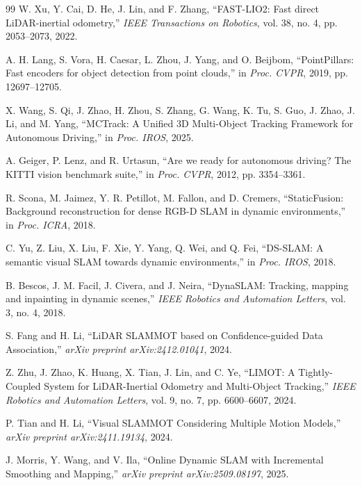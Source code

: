 \documentclass[a4paper,12pt]{article}
\begin{document}
\clearpage
{}
\begin{thebibliography}{99}
W. Xu, Y. Cai, D. He, J. Lin, and F. Zhang, ``FAST-LIO2: Fast direct LiDAR-inertial odometry,'' \emph{IEEE Transactions on Robotics}, vol. 38, no. 4, pp. 2053--2073, 2022.

A. H. Lang, S. Vora, H. Caesar, L. Zhou, J. Yang, and O. Beijbom, ``PointPillars: Fast encoders for object detection from point clouds,'' in \emph{Proc. CVPR}, 2019, pp. 12697--12705.

X. Wang, S. Qi, J. Zhao, H. Zhou, S. Zhang, G. Wang, K. Tu, S. Guo, J. Zhao, J. Li, and M. Yang, ``MCTrack: A Unified 3D Multi-Object Tracking Framework for Autonomous Driving,'' in \emph{Proc. IROS}, 2025.

A. Geiger, P. Lenz, and R. Urtasun, ``Are we ready for autonomous driving? The KITTI vision benchmark suite,'' in \emph{Proc. CVPR}, 2012, pp. 3354--3361.

R. Scona, M. Jaimez, Y. R. Petillot, M. Fallon, and D. Cremers, ``StaticFusion: Background reconstruction for dense RGB-D SLAM in dynamic environments,'' in \emph{Proc. ICRA}, 2018.

C. Yu, Z. Liu, X. Liu, F. Xie, Y. Yang, Q. Wei, and Q. Fei, ``DS-SLAM: A semantic visual SLAM towards dynamic environments,'' in \emph{Proc. IROS}, 2018.

B. Bescos, J. M. Facil, J. Civera, and J. Neira, ``DynaSLAM: Tracking, mapping and inpainting in dynamic scenes,'' \emph{IEEE Robotics and Automation Letters}, vol. 3, no. 4, 2018.

S. Fang and H. Li, ``LiDAR SLAMMOT based on Confidence-guided Data Association,'' \emph{arXiv preprint arXiv:2412.01041}, 2024.

Z. Zhu, J. Zhao, K. Huang, X. Tian, J. Lin, and C. Ye, ``LIMOT: A Tightly-Coupled System for LiDAR-Inertial Odometry and Multi-Object Tracking,'' \emph{IEEE Robotics and Automation Letters}, vol. 9, no. 7, pp. 6600--6607, 2024.

P. Tian and H. Li, ``Visual SLAMMOT Considering Multiple Motion Models,'' \emph{arXiv preprint arXiv:2411.19134}, 2024.

J. Morris, Y. Wang, and V. Ila, ``Online Dynamic SLAM with Incremental Smoothing and Mapping,'' \emph{arXiv preprint arXiv:2509.08197}, 2025.


\end{thebibliography}
\end{document}
